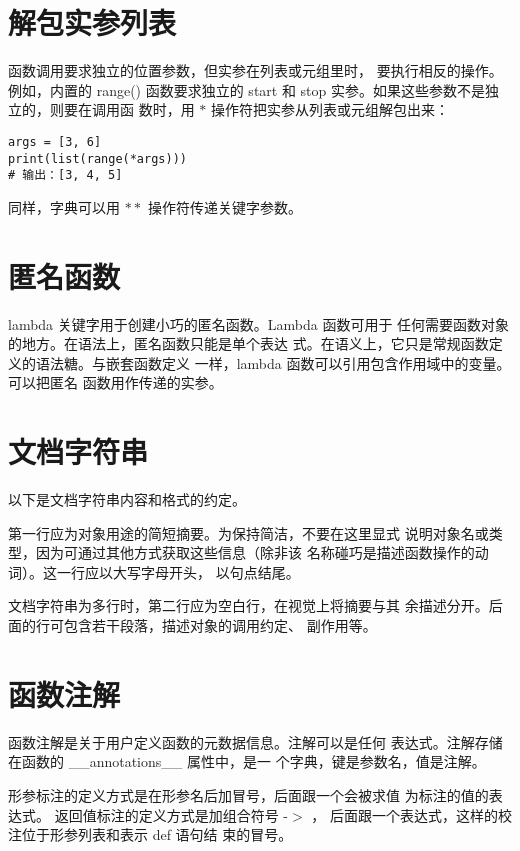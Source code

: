 \documentclass[a4paper, 12pt]{article}
\begin{document}
\section{解包实参列表}
函数调用要求独立的位置参数，但实参在列表或元组里时，
要执行相反的操作。例如，内置的 range() 函数要求独立的 
start 和 stop 实参。如果这些参数不是独立的，则要在调用函
数时，用 $\ast$ 操作符把实参从列表或元组解包出来：\par
\begin{listing}[h!]
\begin{verbatim}
args = [3, 6]
print(list(range(*args)))
# 输出：[3, 4, 5]
\end{verbatim}
\end{listing}
同样，字典可以用 $\ast\ast$ 操作符传递关键字参数。\par

\section{匿名函数}
lambda 关键字用于创建小巧的匿名函数。Lambda 函数可用于
任何需要函数对象的地方。在语法上，匿名函数只能是单个表达
式。在语义上，它只是常规函数定义的语法糖。与嵌套函数定义
一样，lambda 函数可以引用包含作用域中的变量。可以把匿名
函数用作传递的实参。\par

\section{文档字符串}
以下是文档字符串内容和格式的约定。\par
第一行应为对象用途的简短摘要。为保持简洁，不要在这里显式
说明对象名或类型，因为可通过其他方式获取这些信息（除非该
名称碰巧是描述函数操作的动词）。这一行应以大写字母开头，
以句点结尾。\par
文档字符串为多行时，第二行应为空白行，在视觉上将摘要与其
余描述分开。后面的行可包含若干段落，描述对象的调用约定、
副作用等。\par

\section{函数注解}
函数注解是关于用户定义函数的元数据信息。注解可以是任何
表达式。注解存储在函数的 \_\_annotations\_\_ 属性中，是一
个字典，键是参数名，值是注解。\par
形参标注的定义方式是在形参名后加冒号，后面跟一个会被求值
为标注的值的表达式。 返回值标注的定义方式是加组合符号 -$>$ ，
后面跟一个表达式，这样的校注位于形参列表和表示 def 语句结
束的冒号。\par
\end{document}
